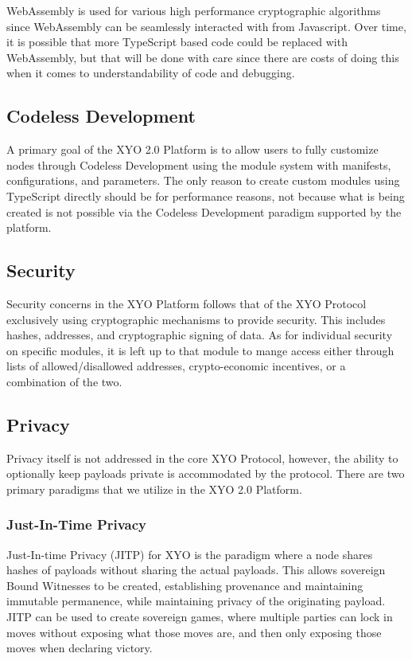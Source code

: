\documentclass{article}
\begin{document}
WebAssembly is used for various high performance cryptographic algorithms since WebAssembly can be seamlessly interacted with from Javascript.  Over time, it is possible that more TypeScript based code could be replaced with WebAssembly, but that will be done with care since there are costs of doing this when it comes to understandability of code and debugging.

\subsection {Codeless Development}
A primary goal of the XYO 2.0 Platform is to allow users to fully customize nodes through Codeless Development using the module system with manifests, configurations, and parameters. The only reason to create custom modules using TypeScript directly should be for performance reasons, not because what is being created is not possible via the Codeless Development paradigm supported by the platform.

\subsection {Security}
Security concerns in the XYO Platform follows that of the XYO Protocol exclusively using cryptographic mechanisms to provide security.  This includes hashes, addresses, and cryptographic signing of data.  As for individual security on specific modules, it is left up to that module to mange access either through lists of allowed/disallowed addresses, crypto-economic incentives, or a combination of the two.

\subsection {Privacy}
Privacy itself is not addressed in the core XYO Protocol, however, the ability to optionally keep payloads private is accommodated by the protocol.  There are two primary paradigms that we utilize in the XYO 2.0 Platform.

\subsubsection{Just-In-Time Privacy}
Just-In-time Privacy (JITP) for XYO is the paradigm where a node shares hashes of payloads without sharing the actual payloads. This allows sovereign Bound Witnesses to be created, establishing provenance and maintaining immutable permanence, while maintaining privacy of the originating payload.  JITP can be used to create sovereign games, where multiple parties can lock in moves without exposing what those moves are, and then only exposing those moves when declaring victory.
\end{document}
